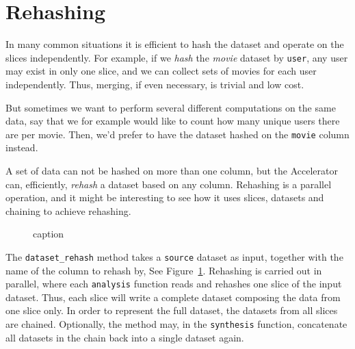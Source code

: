 \documentclass[a4paper]{article}
\begin{document}
\clearpage


\section{Rehashing}

In many common situations it is efficient to hash the dataset and
operate on the slices independently.  For example, if we \textsl{hash}
the \textsl{movie} dataset by \texttt{user}, any user may exist in
only one slice, and we can collect sets of movies for each user
independently.  Thus, merging, if even necessary, is trivial and low
cost.

But sometimes we want to perform several different computations on the
same data, say that we for example would like to count how many unique
users there are per movie.  Then, we'd prefer to have the dataset
hashed on the \texttt{movie} column instead.

A set of data can not be hashed on more than one column, but the
Accelerator can, efficiently, \textsl{rehash} a dataset based on any
column.  Rehashing is a parallel operation, and it might be
interesting to see how it uses slices, datasets and chaining to
achieve rehashing.

\begin{figure}[h!]
  \begin{center}
    
    \caption{caption}
    \label{fig:rehash}
  \end{center}
\end{figure}

The \texttt{dataset\_rehash} method takes a \texttt{source} dataset as
input, together with the name of the column to rehash by, See
Figure~\ref{fig:rehash}.  Rehashing is carried out in parallel, where
each \texttt{analysis} function reads and rehashes one slice of the
input dataset.  Thus, each slice will write a complete dataset
composing the data from one slice only.  In order to represent the
full dataset, the datasets from all slices are chained.  Optionally,
the method may, in the \texttt{synthesis} function, concatenate all
datasets in the chain back into a single dataset again.
\end{document}
